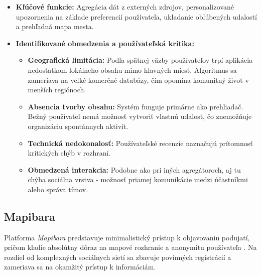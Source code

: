 \begin{itemize}[noitemsep]
    \item \textbf{Kľúčové funkcie:} Agregácia dát z externých zdrojov, personalizované upozornenia na základe preferencií používateľa, ukladanie obľúbených udalostí a prehľadná mapa mesta.
    \item \textbf{Identifikované obmedzenia a používateľská kritika:} 
    \begin{itemize}[noitemsep]
        \item \textbf{Geografická limitácia:} Podľa spätnej väzby používateľov trpí aplikácia nedostatkom 
        lokálneho obsahu mimo hlavných miest. Algoritmus sa zameriava na veľké komerčné databázy, čím opomína komunitný život v menších regiónoch.
        \item \textbf{Absencia tvorby obsahu:} Systém funguje primárne ako prehliadač.
         Bežný používateľ nemá možnosť vytvoriť vlastnú udalosť, čo znemožňuje organizáciu spontánnych aktivít.
        \item \textbf{Technická nedokonalosť:} Používateľské recenzie naznačujú prítomnosť kritických chýb v rozhraní.
        \item \textbf{Obmedzená interakcia:} Podobne ako pri iných agregátoroch, aj tu chýba sociálna vrstva - možnosť priamej komunikácie medzi účastníkmi alebo správa tímov.
    \end{itemize}
\end{itemize}\cite{hapsy_play}



\subsection{Mapibara}
Platforma \textit{Mapibara} predstavuje minimalistický prístup k objavovaniu podujatí,
pričom kladie absolútny dôraz na mapové rozhranie a anonymitu používateľa .
Na rozdiel od komplexných sociálnych sietí sa zbavuje povinných registrácií a zameriava sa na okamžitý prístup k informáciám.

